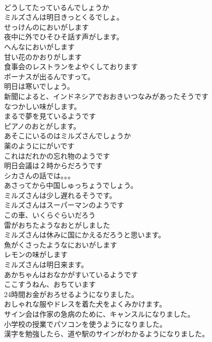 \documentclass[8pt]{extreport}
\begin{document}
\begin{CJK}{UTF8}{min}
\\	どうしてたっているんでしょうか
\\	ミルズさんは明日きっとくるでしょ。
\\	せっけんのにおいがします
\\	夜中に外でひそひそ話す声がします。
\\	へんなにおいがします
\\	甘い花のかおりがします
\\	食事会のレストランをよやくしております
\\	ボーナスが出るんですって。
\\	明日は寒いでしょう。
\\	新聞によると、インドネシアでおおきいつなみがあったそうです
\\	なつかしい味がします。
\\	まるで夢を見ているようです
\\	ピアノのおとがします。
\\	あそこにいるのはミルズさんでしょうか
\\	薬のようににがいです
\\	これはだれかの忘れ物のようです
\\	明日会議は２時からだろうです
\\	シカさんの話では。。。
\\	あさってから中国しゅっちょうでしょう。
\\	ミルズさんは少し遅れるそうです。
\\	ミルズさんはスーパーマンのようです
\\	この車、いくらぐらいだろう
\\	雷がおちたようなおとがしました
\\	ミルズさんは休みに国にかえるだろうと思います。
\\	魚がくさったようなにおいがします
\\	レモンの味がします
\\	ミルズさんは明日来ます。
\\	あかちゃんはおなかがすいているようです
\\	ここすうねん、おちています
\\	24時間お金がおろせるようになりました。
\\	おしゃれな服やドレスを着た犬をよくみかけます。
\\	サイン会は作家の急病のために、キャンスルになりました。
\\	小学校の授業でパソコンを使うようになりました。
\\	漢字を勉強したら、道や駅のサインがわかるようになりました。

\end{CJK}
\end{document}
